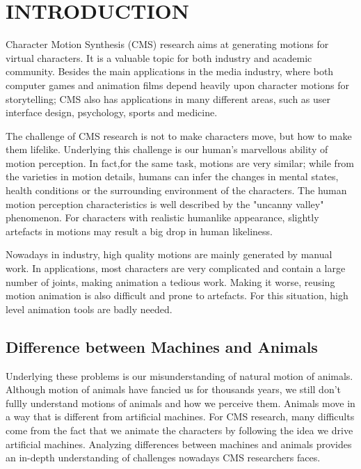 \chapter{INTRODUCTION}
\label{chap:intro}
\ifpdf
    \graphicspath{{Introduction/IntroductionFigs/PNG/}{Introduction/IntroductionFigs/PDF/}{Introduction/IntroductionFigs/}}
\else
    \graphicspath{{Introduction/IntroductionFigs/EPS/}{Introduction/IntroductionFigs/}}
\fi

Character Motion Synthesis (CMS) research aims at generating motions for virtual characters.
It is a valuable topic for both industry and academic community. 
Besides the main applications in the media industry, where both computer games and animation films depend heavily upon character motions for storytelling;  
CMS also has applications in many different areas, such as user interface design, psychology, sports and medicine.

The challenge of CMS research is not to make characters move, but how to make them lifelike. 
Underlying this challenge is our human's marvellous ability of motion perception. 
In fact,for the same task, motions are very similar; 
while from the varieties in motion details, humans can infer the changes in mental states, health conditions or the surrounding environment of the characters.
The human motion perception characteristics is well described by the "uncanny valley" phenomenon.
For characters with realistic humanlike appearance, slightly artefacts in motions may result a big drop in human likeliness.



Nowadays in industry, high quality motions are mainly generated by manual work. 
In applications, most characters are very complicated and contain a large number of joints, making animation a tedious work.
Making it worse, reusing motion animation is also difficult and prone to artefacts.
For this situation, high level animation tools are badly needed. 
 

\section{Difference between Machines and Animals}
Underlying these problems is our misunderstanding of natural motion of animals.
Although motion of animals have fancied us for thousands years, we still don't fullly understand motions of animals and how we perceive them.
Animals move in a way that is different from artificial machines.
For CMS research, many difficults come from the fact that we animate the characters by following the idea we drive artificial machines.
Analyzing differences between machines and animals provides an in-depth understanding of challenges nowadays CMS researchers faces.

